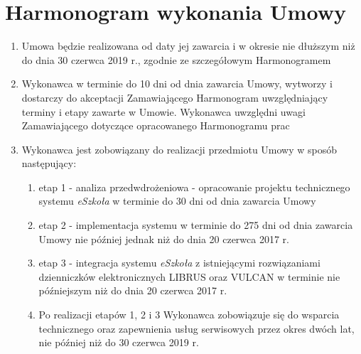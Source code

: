 \documentclass{article}
\begin{document}
\section{Harmonogram wykonania Umowy}
\begin{enumerate}
    \item Umowa będzie realizowana od daty jej zawarcia i w okresie nie dłuższym niż do dnia 30 czerwca 2019 r., zgodnie ze szczegółowym Harmonogramem
    \item Wykonawca w terminie do 10 dni od dnia zawarcia Umowy, wytworzy i dostarczy do akceptacji Zamawiającego Harmonogram uwzględniający terminy i etapy zawarte w Umowie. Wykonawca uwzględni uwagi Zamawiającego dotyczące opracowanego Harmonogramu prac
    \item Wykonawca jest zobowiązany do realizacji przedmiotu Umowy w sposób następujący:
    \begin{enumerate}
        \item etap 1 - analiza przedwdrożeniowa - opracowanie projektu technicznego systemu \textit{eSzkoła} w terminie do 30 dni od dnia zawarcia Umowy
        \item etap 2 - implementacja systemu w terminie do 275 dni od dnia zawarcia      Umowy nie później jednak niż do dnia 20 czerwca 2017 r.
        \item etap 3 - integracja systemu \textit{eSzkoła} z istniejącymi rozwiązaniami dzienniczków elektronicznych LIBRUS oraz VULCAN w terminie nie późniejszym niż do dnia 20 czerwca 2017 r.
        \item Po realizacji etapów 1, 2 i 3 Wykonawca zobowiązuje się do wsparcia technicznego oraz zapewnienia usług serwisowych przez okres dwóch lat, nie później niż do 30 czerwca 2019 r.
    \end{enumerate}
\end{enumerate}

\end{document}
